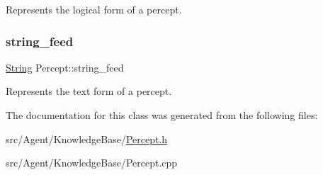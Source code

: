 Represents the logical form of a percept. \mbox{\label{classPercept_acd9d577a5dce1064a78d87f26ec10be7}} 
\subsubsection{\texorpdfstring{string\+\_\+feed}{string\_feed}}
{\footnotesize\ttfamily \mbox{\hyperlink{classString}{String}} Percept\+::string\+\_\+feed\hspace{0.3cm}{\ttfamily [private]}}

Represents the text form of a percept. 

The documentation for this class was generated from the following files\+:\begin{DoxyCompactItemize}
\item 
src/\+Agent/\+Knowledge\+Base/\mbox{\hyperlink{Percept_8h}{Percept.\+h}}\item 
src/\+Agent/\+Knowledge\+Base/Percept.\+cpp\end{DoxyCompactItemize}
